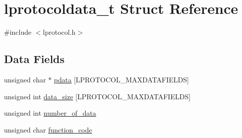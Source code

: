 \hypertarget{structlprotocoldata__t}{
\section{lprotocoldata\_\-t Struct Reference}
\label{structlprotocoldata__t}
}


{\ttfamily \#include $<$lprotocol.h$>$}\subsection*{Data Fields}
\begin{DoxyCompactItemize}
\item 
unsigned char $\ast$ \hyperlink{structlprotocoldata__t_af79115ffc4e2dcca229b8883c5578c8b}{pdata} \mbox{[}LPROTOCOL\_\-MAXDATAFIELDS\mbox{]}
\item 
unsigned int \hyperlink{structlprotocoldata__t_ab055641d3928c9fa48f39acea207bc4f}{data\_\-size} \mbox{[}LPROTOCOL\_\-MAXDATAFIELDS\mbox{]}
\item 
unsigned int \hyperlink{structlprotocoldata__t_a2160b071039853bf1534a09e89b92bdc}{number\_\-of\_\-data}
\item 
unsigned char \hyperlink{structlprotocoldata__t_a4dbe150a36c617bdbd5c8b8c811d943e}{function\_\-code}
\end{DoxyCompactItemize}


